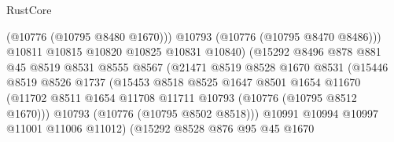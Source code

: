\begin{lexlean}{RustCore}
\begin{coremodule}
                                        (@10776 (@10795 @8480 @1670)))
                                      @10793
                                      (@10776 (@10795 @8470 @8486)))
                                    @10811
                                    @10815
                                    @10820
                                    @10825
                                    @10831
                                    @10840)
                                  (@15292
                                    @8496
                                    @878
                                    @881
                                    @45
                                    @8519
                                    @8531
                                    @8555
                                    @8567
                                    (@21471
                                      @8519
                                      @8528
                                      @1670
                                      @8531
                                      (@15446
                                        @8519
                                        @8526
                                        @1737
                                        (@15453
                                          @8518
                                          @8525
                                          @1647
                                          @8501
                                          @1654
                                          @11670
                                          (@11702
                                            @8511
                                            @1654
                                            @11708
                                            @11711
                                            @10793
                                            (@10776 (@10795 @8512 @1670)))
                                          @10793
                                          (@10776 (@10795 @8502 @8518)))
                                        @10991
                                        @10994
                                        @10997
                                        @11001
                                        @11006
                                        @11012)
                                      (@15292
                                        @8528
                                        @876
                                        @95
                                        @45
                                        @1670

\end{coremodule}
\end{lexlean}
